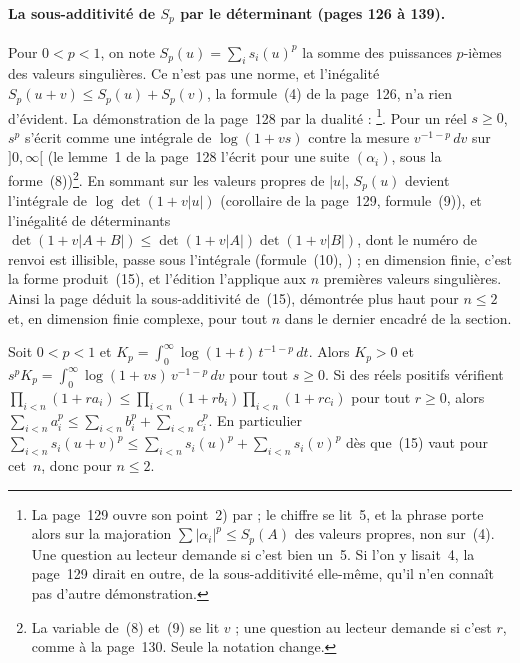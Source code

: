 \paragraph{La sous-additivité de $S_p$ par le déterminant (pages 126 à 139).} Pour $0 < p < 1$, on note $S_p(u) = \sum_i s_i(u)^p$ la somme des puissances $p$-ièmes des valeurs singulières. Ce n'est pas une norme, et l'inégalité $S_p(u + v) \leq S_p(u) + S_p(v)$, la formule~(4) de la page~126, n'a rien d'évident. La démonstration de la page~128 par la dualité  : \footnote{La page~129 ouvre son point~2) par  ; le chiffre se lit~5, et la phrase porte alors sur la majoration $\sum |\alpha_i|^p \leq S_p(A)$ des valeurs propres, non sur~(4). Une question au lecteur demande si c'est bien un~5. Si l'on y lisait~4, la page~129 dirait en outre, de la sous-additivité elle-même, qu'il n'en connaît pas d'autre démonstration.}. Pour un réel $s \geq 0$, $s^p$ s'écrit comme une intégrale de $\log(1 + vs)$ contre la mesure $v^{-1-p}\,dv$ sur $]0, \infty[$ (le lemme~1 de la page~128 l'écrit pour une suite $(\alpha_i)$, sous la forme~(8))\footnote{La variable de~(8) et~(9) se lit $v$ ; une question au lecteur demande si c'est $r$, comme à la page~130. Seule la notation change.}. En sommant sur les valeurs propres de $|u|$, $S_p(u)$ devient l'intégrale de $\log\det(1 + v|u|)$ (corollaire de la page~129, formule~(9)), et l'inégalité de déterminants $\det(1 + v|A+B|) \leq \det(1 + v|A|)\det(1 + v|B|)$, dont le numéro de renvoi est illisible, passe sous l'intégrale (formule~(10), ) ; en dimension finie, c'est la forme produit~(15), et l'édition l'applique aux $n$ premières valeurs singulières. Ainsi la page déduit la sous-additivité de~(15), démontrée plus haut pour $n \leq 2$ et, en dimension finie complexe, pour tout $n$ dans le dernier encadré de la section.

\begin{encadre}
\begin{theoreme}
Soit $0 < p < 1$ et $K_p = \int_0^\infty \log(1 + t)\, t^{-1-p}\,dt$. Alors $K_p > 0$ et $s^p K_p = \int_0^\infty \log(1 + vs)\, v^{-1-p}\,dv$ pour tout $s \geq 0$. Si des réels positifs vérifient $\prod_{i<n}(1 + r a_i) \leq \prod_{i<n}(1 + r b_i) \prod_{i<n}(1 + r c_i)$ pour tout $r \geq 0$, alors $\sum_{i<n} a_i^p \leq \sum_{i<n} b_i^p + \sum_{i<n} c_i^p$. En particulier $\sum_{i<n} s_i(u+v)^p \leq \sum_{i<n} s_i(u)^p + \sum_{i<n} s_i(v)^p$ dès que~(15) vaut pour cet~$n$, donc pour $n \leq 2$.
\end{theoreme}
\end{encadre}

